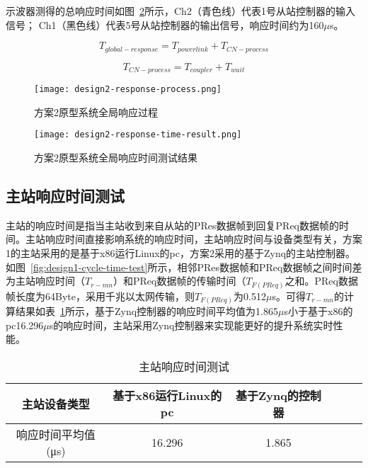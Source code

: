 示波器测得的总响应时间如图~\ref{fig:design2-response-time-result}所示，Ch2（青色线）代表1号从站控制器的输入信号； Ch1（黑色线）代表5号从站控制器的输出信号，响应时间约为160$\mu$s。

\begin{equation}
\label{equation1}
T_{global-response}=T_{powerlink}+T_{CN-process}
\end{equation}

\begin{equation}
\label{equation2}
T_{CN-process}=T_{coupler}+T_{wait}
\end{equation}

\begin{figure}[!htb]
  \centering
  \texttt{[image: design2-response-process.png]}
  \caption{方案2原型系统全局响应过程}
  \label{fig:design2-response-process}
\end{figure}

\begin{figure}[!htb]
  \centering
  \texttt{[image: design2-response-time-result.png]}
  \caption{方案2原型系统全局响应时间测试结果}
  \label{fig:design2-response-time-result}
\end{figure}

\subsection{主站响应时间测试}
主站的响应时间是指当主站收到来自从站的PRes数据帧到回复PReq数据帧的时间。主站响应时间直接影响系统的响应时间，主站响应时间与设备类型有关，方案1的主站采用的是基于x86运行Linux的pc，方案2采用的基于Zynq的主站控制器。如图~\ref{fig:design1-cycle-time-test}所示，相邻PRes数据帧和PReq数据帧之间时间差为主站响应时间（$T_{r-mn}$）和PReq数据帧的传输时间（$T_{F(PReq)}$之和。PReq数据帧长度为64Byte，采用千兆以太网传输，则$T_{F(PReq)}$为0.512$\mu$s。可得$T_{r-mn}$的计算结果如表~\ref{table:3.1}所示，基于Zynq控制器的响应时间平均值为1.865$\mu$s小于基于x86的pc16.296$\mu$s的响应时间，主站采用Zynq控制器来实现能更好的提升系统实时性能。

\begin{table}[hbt]
	\centering
	\caption{主站响应时间测试}
	\begin{tabular}{cccccc}
		\toprule
		主站设备类型 & 基于x86运行Linux的pc & 基于Zynq的控制器 \\
		\midrule
		响应时间平均值(μs) & 16.296 & 1.865 \\
		\bottomrule
	\end{tabular}
	\label{table:3.1}
\end{table}


